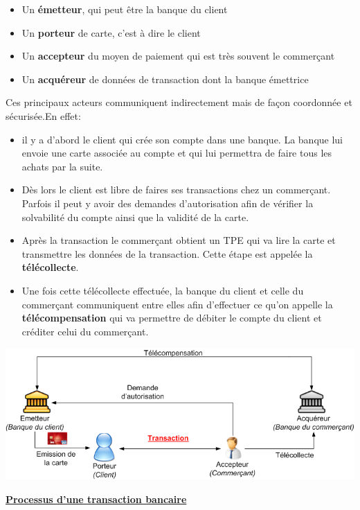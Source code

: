 \documentclass[12pt]{report}
\begin{document}
\begin{itemize}
    \item Un \textbf{émetteur}, qui peut être la banque du client
    \item Un \textbf{porteur} de carte, c'est à dire le client
    \item Un \textbf{accepteur} du moyen de paiement qui est très souvent le commerçant
    \item Un \textbf{acquéreur} de données de transaction dont la banque émettrice
\end{itemize}

Ces principaux acteurs communiquent indirectement mais de façon coordonnée et sécurisée.En effet: 

\begin{itemize}
    \item il y a d'abord le client qui crée son compte dans une banque. La banque lui envoie une carte associée au compte et qui lui permettra de faire tous les achats par la suite.
    \item Dès lors le client est libre de faires ses transactions chez un commerçant. Parfois il peut y avoir des demandes d'autorisation afin de vérifier la solvabilité du compte ainsi que la validité de la carte.
    \item Après la transaction le commerçant obtient un TPE qui va lire la carte et transmettre les données de la transaction. Cette étape est appelée la \textbf{télécollecte}. 
    \item Une fois cette télécollecte effectuée, la banque du client et celle du commerçant communiquent entre elles afin d'effectuer ce qu'on appelle la \textbf{télécompensation} qui va permettre de débiter le compte du client et créditer celui du commerçant. \\[1cm]
\end{itemize}

\includegraphics[width=1\textwidth]{process_transaction}
\begin{center}
   \textbf{\underline{Processus d'une transaction bancaire}} \\[1cm]
\end{center}
\end{document}
